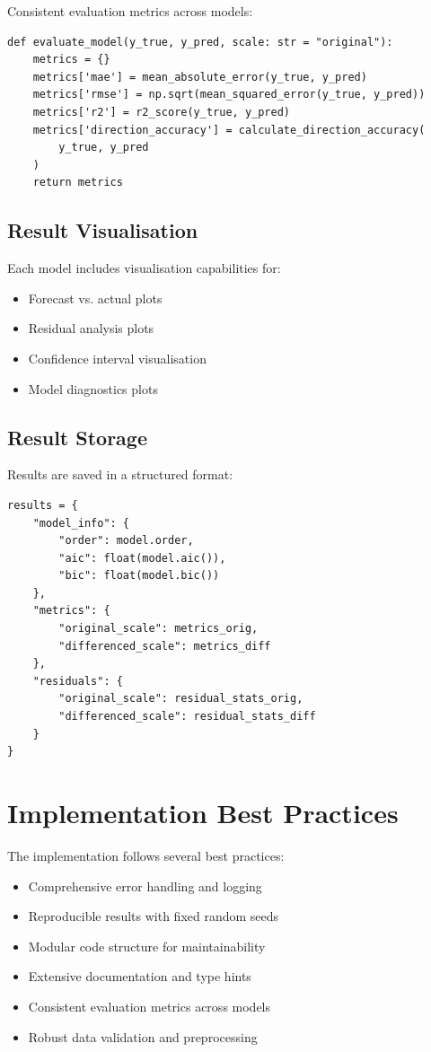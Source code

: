 \documentclass[12pt,a4paper]{report}
\begin{document}
Consistent evaluation metrics across models:

\begin{verbatim}
def evaluate_model(y_true, y_pred, scale: str = "original"):
    metrics = {}
    metrics['mae'] = mean_absolute_error(y_true, y_pred)
    metrics['rmse'] = np.sqrt(mean_squared_error(y_true, y_pred))
    metrics['r2'] = r2_score(y_true, y_pred)
    metrics['direction_accuracy'] = calculate_direction_accuracy(
        y_true, y_pred
    )
    return metrics
\end{verbatim}

\subsection{Result Visualisation}

Each model includes visualisation capabilities for:
\begin{itemize}
    \item Forecast vs. actual plots
    \item Residual analysis plots
    \item Confidence interval visualisation
    \item Model diagnostics plots
\end{itemize}

\subsection{Result Storage}
Results are saved in a structured format:

\begin{verbatim}
results = {
    "model_info": {
        "order": model.order,
        "aic": float(model.aic()),
        "bic": float(model.bic())
    },
    "metrics": {
        "original_scale": metrics_orig,
        "differenced_scale": metrics_diff
    },
    "residuals": {
        "original_scale": residual_stats_orig,
        "differenced_scale": residual_stats_diff
    }
}
\end{verbatim}

\section{Implementation Best Practices}
The implementation follows several best practices:

\begin{itemize}
    \item Comprehensive error handling and logging
    \item Reproducible results with fixed random seeds
    \item Modular code structure for maintainability
    \item Extensive documentation and type hints
    \item Consistent evaluation metrics across models
    \item Robust data validation and preprocessing
\end{itemize}
\end{document}
